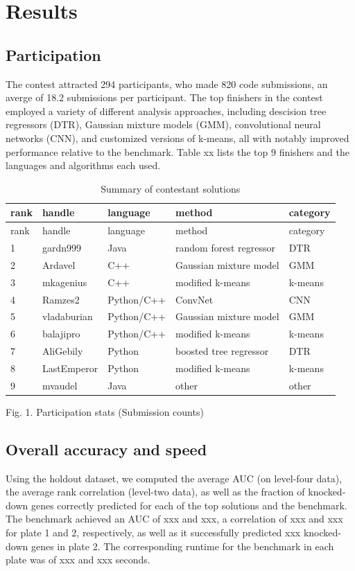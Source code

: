 \documentclass[]{article}
\begin{document}
\hypertarget{results}{%
\section{Results}\label{results}}

\hypertarget{participation}{%
\subsection{Participation}\label{participation}}

The contest attracted 294 participants, who made 820 code submissions,
an averge of 18.2 submissions per participant. The top finishers in the
contest employed a variety of different analysis approaches, including
descision tree regressors (DTR), Gaussian mixture models (GMM),
convolutional neural networks (CNN), and customized versions of k-means,
all with notably improved performance relative to the benchmark. Table
xx lists the top 9 finishers and the languages and algorithms each used.

\begin{longtable}[]{@{}lllll@{}}
\caption{Summary of contestant solutions}\tabularnewline
\toprule
rank & handle & language & method & category\tabularnewline
\midrule
\endfirsthead
\toprule
rank & handle & language & method & category\tabularnewline
\midrule
\endhead
1 & gardn999 & Java & random forest regressor & DTR\tabularnewline
2 & Ardavel & C++ & Gaussian mixture model & GMM\tabularnewline
3 & mkagenius & C++ & modified k-means & k-means\tabularnewline
4 & Ramzes2 & Python/C++ & ConvNet & CNN\tabularnewline
5 & vladaburian & Python/C++ & Gaussian mixture model &
GMM\tabularnewline
6 & balajipro & Python/C++ & modified k-means & k-means\tabularnewline
7 & AliGebily & Python & boosted tree regressor & DTR\tabularnewline
8 & LastEmperor & Python & modified k-means & k-means\tabularnewline
9 & mvaudel & Java & other & other\tabularnewline
\bottomrule
\end{longtable}

Fig. 1. Participation stats (Submission counts)

\hypertarget{overall-accuracy-and-speed}{%
\subsection{Overall accuracy and
speed}\label{overall-accuracy-and-speed}}

Using the holdout dataset, we computed the average AUC (on level-four
data), the average rank correlation (level-two data), as well as the
fraction of knocked-down genes correctly predicted for each of the top
solutions and the benchmark. The benchmark achieved an AUC of xxx and
xxx, a correlation of xxx and xxx for plate 1 and 2, respectively, as
well as it successfully predicted xxx knocked-down genes in plate 2. The
corresponding runtime for the benchmark in each plate was of xxx and xxx
seconds.
\end{document}
